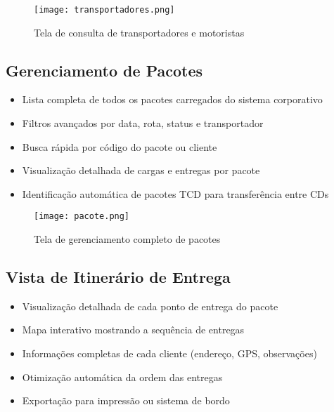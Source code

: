 \documentclass[12pt,a4paper]{article}
\begin{document}
\begin{figure}[H]
    \centering
    \vspace{1cm} %
    \texttt{[image: transportadores.png]}
    \vspace{1cm} %
    \caption{Tela de consulta de transportadores e motoristas}
\end{figure}

\subsection{Gerenciamento de Pacotes}
\begin{itemize}
    \item Lista completa de todos os pacotes carregados do sistema corporativo
    \item Filtros avançados por data, rota, status e transportador
    \item Busca rápida por código do pacote ou cliente
    \item Visualização detalhada de cargas e entregas por pacote
    \item Identificação automática de pacotes TCD para transferência entre CDs
\end{itemize}

\begin{figure}[H]
    \centering
    \vspace{1cm} %
    \texttt{[image: pacote.png]}
    \vspace{1cm} %
    \caption{Tela de gerenciamento completo de pacotes}
\end{figure}

\subsection{Vista de Itinerário de Entrega}
\begin{itemize}
    \item Visualização detalhada de cada ponto de entrega do pacote
    \item Mapa interativo mostrando a sequência de entregas
    \item Informações completas de cada cliente (endereço, GPS, observações)
    \item Otimização automática da ordem das entregas
    \item Exportação para impressão ou sistema de bordo
\end{itemize}
\end{document}
